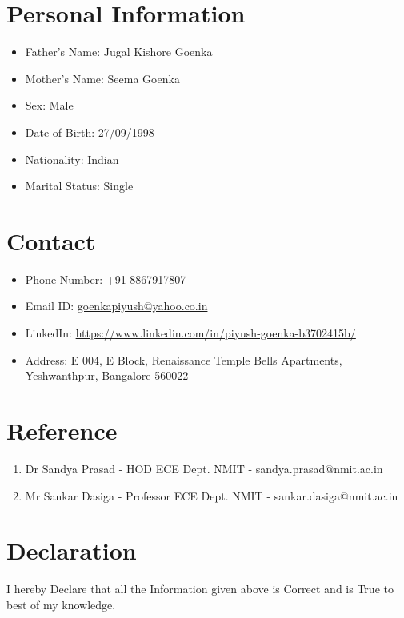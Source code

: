 \documentclass[12pt,a4paper,sans]{moderncv} %
\begin{document}
\section{Personal Information}

\begin{itemize}
	
	
	\item Father's Name: Jugal Kishore Goenka
	\item Mother's Name: Seema Goenka
	\item Sex: Male
	\item Date of Birth: 27/09/1998
	\item Nationality: Indian
	\item Marital Status: Single
\end{itemize}



\section{Contact}
\begin{itemize}
	\item Phone Number: +91 8867917807
	\item Email ID: \url{goenkapiyush@yahoo.co.in}
	\item LinkedIn: \url{https://www.linkedin.com/in/piyush-goenka-b3702415b/}
	\item Address: E 004, E Block, Renaissance Temple Bells Apartments, Yeshwanthpur, Bangalore-560022
	
\end{itemize}


\section{Reference}
\begin{enumerate}
	\item Dr Sandya Prasad - HOD ECE Dept. NMIT - sandya.prasad@nmit.ac.in
	\item Mr Sankar Dasiga - Professor ECE Dept. NMIT - sankar.dasiga@nmit.ac.in
	
\end{enumerate}

\section{Declaration}
I hereby Declare that all the Information given above is Correct and is True to best of my knowledge.
\end{document}
